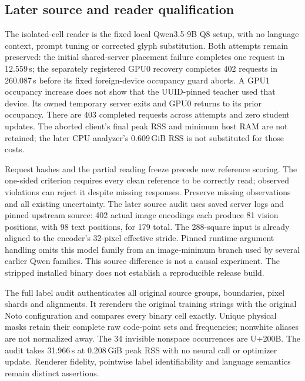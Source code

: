 \subsection*{Later source and reader qualification}

The isolated-cell reader is the fixed local Qwen3.5-9B Q8 setup, with no language
context, prompt tuning or corrected glyph substitution. Both attempts remain
preserved: the initial shared-server placement failure completes one request in
12.559\,s; the separately registered GPU0 recovery completes 402 requests in
260.087\,s before its fixed foreign-device occupancy guard aborts. A GPU1
occupancy increase does not show that the UUID-pinned teacher used that device.
Its owned temporary server exits and GPU0 returns to its prior occupancy.
There are 403 completed requests across attempts and zero student updates.
The aborted client's final peak RSS and minimum host RAM are not retained;
the later CPU analyzer's 0.609\,GiB RSS is not substituted for those costs.

Request hashes and the partial reading freeze precede new reference scoring.
The one-sided criterion requires every clean reference to be correctly read;
observed violations can reject it despite missing responses. Preserve missing
observations and all existing uncertainty. The later source audit uses saved
server logs and pinned upstream source: 402 actual image encodings each produce
81 vision positions, with 98 text positions, for 179 total. The 288-square input
is already aligned to the encoder's 32-pixel effective stride. Pinned runtime
argument handling omits this model family from an image-minimum branch used by
several earlier Qwen families. This source difference is not a causal experiment.
The stripped installed binary does not establish a reproducible release build.

The full label audit authenticates all original source groups, boundaries,
pixel shards and alignments. It rerenders the original training strings with
the original Noto configuration and compares every binary cell exactly. Unique
physical masks retain their complete raw code-point sets and frequencies;
nonwhite aliases are not normalized away. The 34 invisible nonspace occurrences
are U+200B. The audit takes 31.966\,s at 0.208\,GiB peak RSS with no neural call
or optimizer update. Renderer fidelity, pointwise label identifiability and
language semantics remain distinct assertions.


